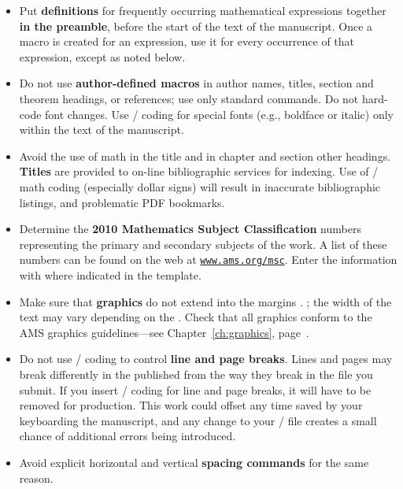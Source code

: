 \begin{itemize}
\item Put \textbf{definitions} for frequently occurring mathematical
 expressions together \textbf{in the preamble}, before the start of the
 text of the manuscript.  Once a macro is created for an expression,
 use it for every occurrence of that expression, except as noted below.

\item Do not use \textbf{author-defined macros} in author names, titles,
 section and theorem headings, or references; use only standard commands.
 Do not hard-code font changes.  Use \tex/ coding for special fonts
 (e.g., boldface or italic) only within the text of the manuscript.

\item Avoid the use of math in the title and in
\ifmonograph
 chapter and section
\else
 other
\fi
 headings.
 \textbf{Titles} are provided to on-line bibliographic services for indexing.
 Use of \tex/ math coding (especially dollar signs) will result in
 inaccurate bibliographic listings, and problematic PDF bookmarks.

\item Determine the \textbf{2010 Mathematics Subject Classification} numbers
 representing the primary and secondary subjects of the work.  A list of
 these numbers can be found on the web at
 \href{http://www.ams.org/msc}{\texttt{www.ams.org/msc}}.  Enter the
 information with  where indicated in the template.

\item Make sure that \textbf{graphics} do not extend into the margins%
 \ifmemoirs .
 \else ;
  the width of the text may vary depending on the
  .
 \fi
 Check that all graphics conform to the AMS graphics guidelines---see
 Chapter~\ref{ch:graphics}, page~\pageref{ch:graphics}.
 
\item Do not use \tex/ coding to control \textbf{line and page breaks}. Lines
 and pages may break differently in the published
  from the way
 they break in the file you submit.  If you insert \tex/ coding for
 line and page breaks, it will have to be removed for production.
 This work could offset any time saved by your keyboarding the
 manuscript, and any change to your \tex/ file creates a small chance
 of additional errors being introduced.

\item Avoid explicit horizontal and vertical \textbf{spacing commands}
 for the same reason.


\end{itemize}
